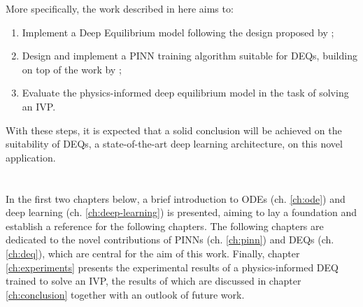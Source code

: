 More specifically, the work described in here aims to:
\begin{enumerate}
    \item Implement a Deep Equilibrium model following the design proposed by \textcite{Bai2019};
    \item Design and implement a \gls{PINN} training algorithm suitable for \gls{DEQ}s, building on top of the work by \textcite{Raissi2019};
    \item Evaluate the physics-informed deep equilibrium model in the task of solving an \gls{IVP}.
\end{enumerate}
With these steps, it is expected that a solid conclusion will be achieved on the suitability of \gls{DEQ}s, a state-of-the-art deep learning architecture, on this novel application.





\section*{}

In the first two chapters below, a brief introduction to \gls{ODE}s (ch. \ref{ch:ode}) and deep learning (ch. \ref{ch:deep-learning}) is presented, aiming to lay a foundation and establish a reference for the following chapters.
The following chapters are dedicated to the novel contributions of \gls{PINN}s (ch. \ref{ch:pinn}) and \gls{DEQ}s (ch. \ref{ch:deq}), which are central for the aim of this work.
Finally, chapter \ref{ch:experiments} presents the experimental results of a physics-informed \gls{DEQ} trained to solve an \gls{IVP}, the results of which are discussed in chapter \ref{ch:conclusion} together with an outlook of future work.
